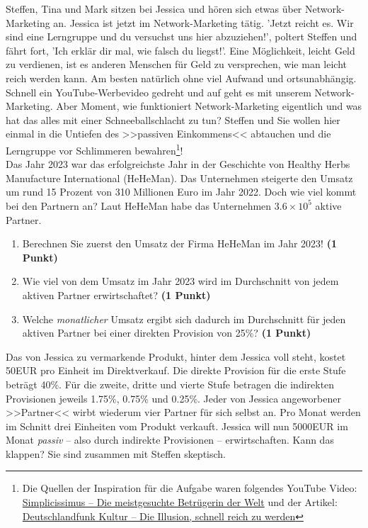 \documentclass[a4paper, 9pt]{scrartcl}\usepackage[]{graphicx}\usepackage[]{xcolor}
\begin{document}
Steffen, Tina und Mark sitzen bei Jessica und hören sich etwas über Network-Marketing an. Jessica ist jetzt im Network-Marketing tätig. 'Jetzt reicht es. Wir sind eine Lerngruppe und du versuchst uns hier abzuziehen!', poltert Steffen und fährt fort, 'Ich erklär dir mal, wie falsch du liegst!'. Eine Möglichkeit, leicht Geld zu verdienen, ist es anderen Menschen für Geld zu versprechen, wie man leicht reich werden kann. Am besten natürlich ohne viel Aufwand und ortsunabhängig. Schnell ein YouTube-Werbevideo gedreht und auf geht es mit unserem Network-Marketing. Aber Moment, wie funktioniert Network-Marketing eigentlich und was hat das alles mit einer Schneeballschlacht zu tun? Steffen und Sie wollen hier einmal in die Untiefen des >>passiven Einkommens<< abtauchen und die Lerngruppe vor Schlimmeren bewahren\footnote{Die Quellen der Inspiration für die Aufgabe waren folgendes YouTube Video: \href{https://youtu.be/UOKkZF_qK9M?si=uf4foJVFKfeQMwSw}{Simplicissimus -- Die meistgesuchte Betrügerin der Welt} und der Artikel: \href{https://www.deutschlandfunkkultur.de/netzwerk-marketing-die-illusion-schnell-reich-zu-werden-100.html}{Deutschlandfunk Kultur -- Die Illusion, schnell reich zu werden}}!\\

Das Jahr 2023 war das erfolgreichste Jahr in der Geschichte von Healthy Herbs Manufacture International (HeHeMan). Das Unternehmen steigerte den Umsatz um rund 15 Prozent von 310 Millionen Euro im Jahr 2022. Doch wie viel kommt bei den Partnern an? Laut HeHeMan habe das Unternehmen \ensuremath{3.6\times 10^{5}} aktive Partner.

\begin{enumerate}
\item Berechnen Sie zuerst den Umsatz der Firma HeHeMan im Jahr 2023! \textbf{(1 Punkt)}
\item Wie viel von dem Umsatz im Jahr 2023 wird im Durchschnitt von jedem aktiven Partner erwirtschaftet? \textbf{(1 Punkt)}
\item Welche \textit{monatlicher} Umsatz ergibt sich dadurch im Durchschnitt für jeden aktiven Partner bei einer direkten Provision von 25\%? \textbf{(1 Punkt)}
\end{enumerate}

Das von Jessica zu vermarkende Produkt, hinter dem Jessica voll steht, kostet 50EUR pro Einheit im Direktverkauf. Die direkte Provision für die erste Stufe beträgt 40\%. Für die zweite, dritte und vierte Stufe betragen die indirekten Provisionen jeweils 1.75\%, 0.75\% und 0.25\%. Jeder von Jessica angeworbener >>Partner<< wirbt wiederum vier Partner für sich selbst an. Pro Monat werden im Schnitt drei Einheiten vom Produkt verkauft. Jessica will nun 5000EUR im Monat \textit{passiv} -- also durch indirekte Provisionen -- erwirtschaften. Kann das klappen? Sie sind zusammen mit Steffen skeptisch.
\end{document}
